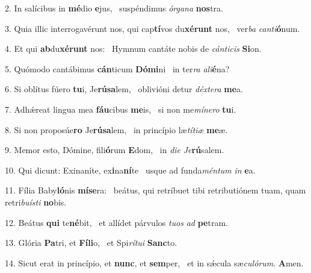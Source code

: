 2. In salícibus in \textbf{mé}dio \textbf{e}jus, \ast\  suspéndimus \textit{ór}\textit{ga}\textit{na} \textbf{nos}tra.\

3. Quia illic interrogavérunt nos, qui cap\textbf{tí}vos du\textbf{xé}\textbf{runt} nos, \ast\  ver\textit{ba} \textit{can}\textit{ti}\textbf{ó}num.\

4. Et qui \textbf{ab}du\textbf{xé}\textbf{runt} nos: \ast\  Hymnum cantáte nobis de \textit{cán}\textit{ti}\textit{cis} \textbf{Si}on.\

5. Quómodo cantábimus \textbf{cán}ticum \textbf{Dó}\textbf{mi}ni \ast\  in ter\textit{ra} \textit{a}\textit{li}\textbf{é}na?\

6. Si oblítus fúero \textbf{tu}i, Je\textbf{rú}\textbf{sa}lem, \ast\  oblivióni detur \textit{déx}\textit{te}\textit{ra} \textbf{me}a.\

7. Adhǽreat lingua mea \textbf{fáu}cibus \textbf{me}is, \ast\  si non me\textit{mí}\textit{ne}\textit{ro} \textbf{tu}i.\

8. Si non proposúe\textbf{ro} Je\textbf{rú}\textbf{sa}lem, \ast\  in princípio læ\textit{tí}\textit{ti}\textit{æ} \textbf{me}æ.\

9. Memor esto, Dómine, fili\textbf{ó}rum \textbf{E}dom, \ast\  in \textit{di}\textit{e} \textit{Je}\textbf{rú}salem.\

10. Qui dicunt: Exinaníte, ex\textbf{i}na\textbf{ní}te \ast\  usque ad funda\textit{mén}\textit{tum} \textit{in} \textbf{e}a.\

11. Fília Baby\textbf{ló}nis \textbf{mí}\textbf{se}ra: \ast\  beátus, qui retríbuet tibi retributiónem tuam, quam retri\textit{bu}\textit{ís}\textit{ti} \textbf{no}bis.\

12. Beátus \textbf{qui} te\textbf{né}bit, \ast\  et allídet párvulos \textit{tu}\textit{os} \textit{ad} \textbf{pe}tram.\

13. Glória \textbf{Pa}tri, et \textbf{Fí}\textbf{li}o, \ast\  et Spi\textit{rí}\textit{tu}\textit{i} \textbf{Sanc}to.\

14. Sicut erat in princípio, et \textbf{nunc}, et \textbf{sem}per, \ast\  et in sǽcula sæ\textit{cu}\textit{ló}\textit{rum}. \textbf{A}men.\

